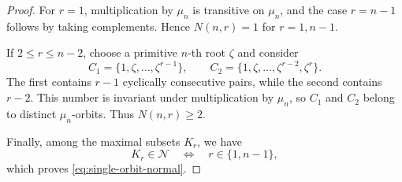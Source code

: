 \documentclass[10pt,a4paper]{amsart}
\begin{document}
\begin{proof}
For \(r=1\), multiplication by \(\mu_n\) is transitive on
\(\mu_n\), and the case \(r=n-1\) follows by taking complements.
Hence \(N(n,r)=1\) for \(r=1,n-1\).

If \(2\le r\le n-2\), choose a primitive \(n\)-th root
\(\zeta\) and consider
\[
C_1=\{1,\zeta,\ldots,\zeta^{r-1}\},
\qquad
C_2=\{1,\zeta,\ldots,\zeta^{r-2},\zeta^r\}.
\]
The first contains \(r-1\) cyclically consecutive pairs, while the
second contains \(r-2\). This number is invariant under multiplication
by \(\mu_n\), so \(C_1\) and \(C_2\) belong to distinct
\(\mu_n\)-orbits. Thus \(N(n,r)\ge2\).

Finally, among the maximal subsets \(K_r\), we have
\[
K_r\in\mathcal N
\quad\Longleftrightarrow\quad
r\in\{1,n-1\},
\]
which proves \eqref{eq:single-orbit-normal}.
\end{proof}
\end{document}
